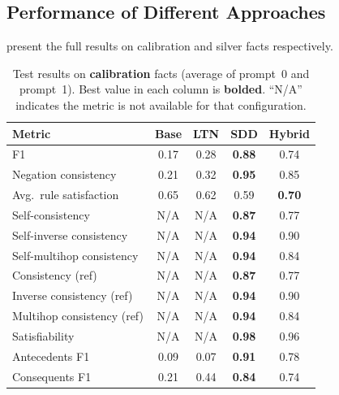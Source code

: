 \documentclass[11pt,a4paper]{article}
\begin{document}
\subsection{Performance of Different Approaches}

 present the full results on
calibration and silver facts respectively.

\begin{table}[H]
\centering
\caption{Test results on \textbf{calibration} facts (average of prompt~0
  and prompt~1).  Best value in each column is \textbf{bolded}.
  ``N/A'' indicates the metric is not available for that configuration.}
\label{tab:main-cal}
\small
\begin{tabular}{@{}lcccc@{}}
\toprule
\textbf{Metric} & \textbf{Base} & \textbf{LTN} & \textbf{SDD} & \textbf{Hybrid} \\
\midrule
F1                          & 0.17  & 0.28  & \textbf{0.88} & 0.74 \\
Negation consistency        & 0.21  & 0.32  & \textbf{0.95} & 0.85 \\
Avg.\ rule satisfaction     & 0.65  & 0.62  & 0.59          & \textbf{0.70} \\
\midrule
Self-consistency            & N/A   & N/A   & \textbf{0.87} & 0.77 \\
Self-inverse consistency    & N/A   & N/A   & \textbf{0.94} & 0.90 \\
Self-multihop consistency   & N/A   & N/A   & \textbf{0.94} & 0.84 \\
Consistency (ref)           & N/A   & N/A   & \textbf{0.87} & 0.77 \\
Inverse consistency (ref)   & N/A   & N/A   & \textbf{0.94} & 0.90 \\
Multihop consistency (ref)  & N/A   & N/A   & \textbf{0.94} & 0.84 \\
Satisfiability              & N/A   & N/A   & \textbf{0.98} & 0.96 \\
\midrule
Antecedents F1              & 0.09  & 0.07  & \textbf{0.91} & 0.78 \\
Consequents F1              & 0.21  & 0.44  & \textbf{0.84} & 0.74 \\
\bottomrule
\end{tabular}
\end{table}
\end{document}
